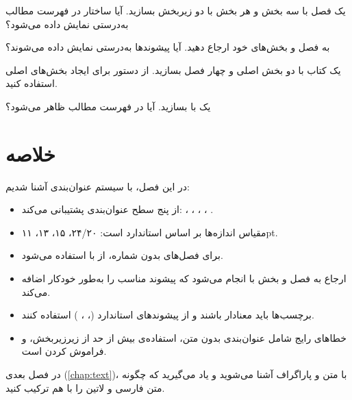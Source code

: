\begin{exercise}
    یک فصل با سه بخش و هر بخش با دو زیربخش
    بسازید. آیا ساختار در فهرست مطالب به‌درستی
    نمایش داده می‌شود؟
    \label{exc:chapters-structure}
\end{exercise}

\begin{exercise}
    به فصل و بخش‌های خود ارجاع دهید. آیا
    پیشوندها به‌درستی نمایش داده می‌شوند؟
    \label{exc:chapters-refs}
\end{exercise}

\begin{exercise}
    یک کتاب با دو بخش اصلی و چهار فصل بسازید.
    از دستور  برای ایجاد بخش‌های
    اصلی استفاده کنید.
    \label{exc:chapters-parts}
\end{exercise}

\begin{exercise}
    یک  با 
    بسازید. آیا در فهرست مطالب ظاهر می‌شود؟
    \label{exc:chapters-star}
\end{exercise}

\section{خلاصه}
\label{sec:chapters-summary}

در این فصل، با سیستم عنوان‌بندی 
آشنا شدیم:

\begin{itemize}
    \item {} از پنج سطح عنوان‌بندی
    پشتیبانی می‌کند: ، ،
    ، ،
    .

    \item مقیاس اندازه‌ها بر اساس استاندارد
     است: ۲۴/۲۰، ۱۵، ۱۳، ۱۱pt.

    \item برای فصل‌های بدون شماره، از
     با 
    استفاده می‌شود.

    \item ارجاع به فصل و بخش با 
    انجام می‌شود که پیشوند مناسب را به‌طور
    خودکار اضافه می‌کند.

    \item برچسب‌ها باید معنادار باشند و از
    پیشوندهای استاندارد (،
    ، ) استفاده کنند.

    \item خطاهای رایج شامل عنوان‌بندی بدون
    متن، استفاده‌ی بیش از حد از زیرزیربخش،
    و فراموش کردن  است.
\end{itemize}

در فصل بعدی (\cref{chap:text})، با متن و
پاراگراف آشنا می‌شوید و یاد می‌گیرید که
چگونه متن فارسی و لاتین را با هم ترکیب کنید.
